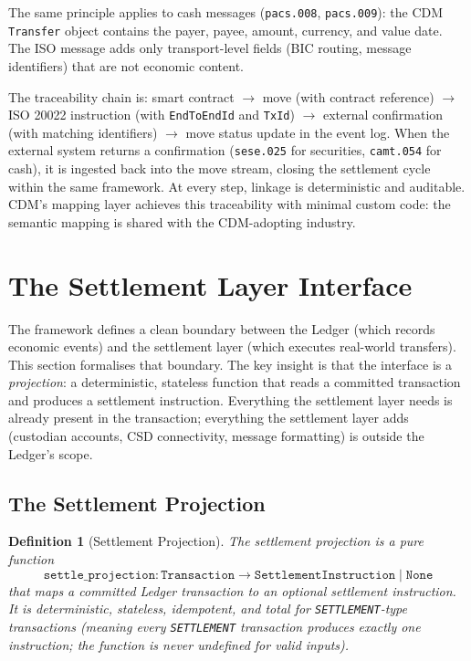 \documentclass[11pt,a4paper]{article}
\newtheorem{definition}{Definition}[section]
\begin{document}
The same principle applies to cash messages (\texttt{pacs.008}, \texttt{pacs.009}): the CDM \texttt{Transfer} object contains the payer, payee, amount, currency, and value date. The ISO message adds only transport-level fields (BIC routing, message identifiers) that are not economic content.

The traceability chain is: smart contract $\to$ move (with contract reference) $\to$ ISO 20022 instruction (with \texttt{EndToEndId} and \texttt{TxId}) $\to$ external confirmation (with matching identifiers) $\to$ move status update in the event log. When the external system returns a confirmation (\texttt{sese.025} for securities, \texttt{camt.054} for cash), it is ingested back into the move stream, closing the settlement cycle within the same framework. At every step, linkage is deterministic and auditable. CDM's mapping layer achieves this traceability with minimal custom code: the semantic mapping is shared with the CDM-adopting industry.

\clearpage
\section{The Settlement Layer Interface}
\label{sec:settlement}

The framework defines a clean boundary between the Ledger (which records economic events) and the settlement layer (which executes real-world transfers). This section formalises that boundary. The key insight is that the interface is a \emph{projection}: a deterministic, stateless function that reads a committed transaction and produces a settlement instruction. Everything the settlement layer needs is already present in the transaction; everything the settlement layer adds (custodian accounts, CSD connectivity, message formatting) is outside the Ledger's scope.

\subsection{The Settlement Projection}
\label{sec:settlement-projection}

\begin{definition}[Settlement Projection]
The settlement projection is a pure function
\[
\texttt{settle\_projection} : \texttt{Transaction} \to \texttt{SettlementInstruction} \mid \texttt{None}
\]
that maps a committed Ledger transaction to an optional settlement instruction. It is deterministic, stateless, idempotent, and total for \texttt{SETTLEMENT}-type transactions (meaning every \texttt{SETTLEMENT} transaction produces exactly one instruction; the function is never undefined for valid inputs).
\end{definition}
\end{document}
